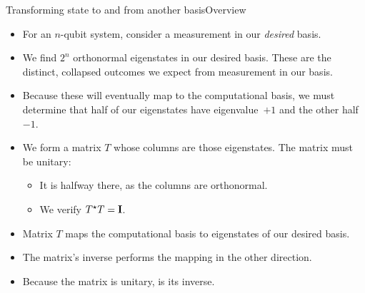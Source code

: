 \begin{frame}{Transforming state to and from another basis}{Overview}

\begin{itemize}[<+->]
    \item For an $n$-qubit system, consider a measurement in our \emph{desired} basis.
    \item We find $2^n$ orthonormal eigenstates in our desired basis. These are the distinct, collapsed outcomes we expect from measurement in our basis.
    \item Because these will eventually map to the computational basis, we must determine that half of our eigenstates have eigenvalue~$+1$ and the other half~$-1$.
    \item We form a matrix $T$ whose columns are those eigenstates.  The matrix must be unitary:
    \begin{itemize}
        \item It is halfway there, as the columns are orthonormal.  
        \item We verify $T^{\star}T=\mbox{\bfseries{\textrm{I}}}$.
    \end{itemize}
    \item Matrix $T$ maps the computational basis to eigenstates of our desired basis.
    \item The matrix's inverse performs the mapping in the other direction.
    \item Because the matrix is unitary,  is its inverse.
\end{itemize}
\end{frame}


